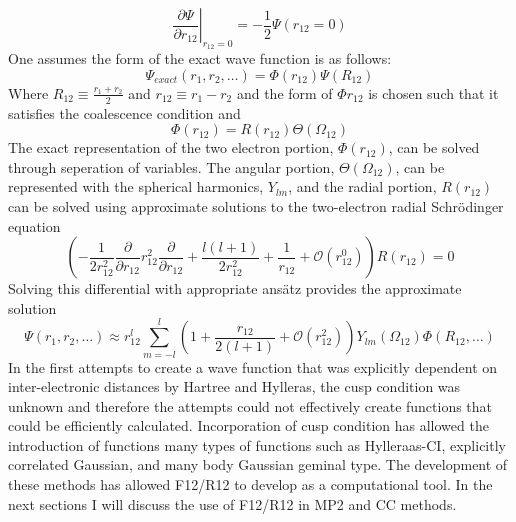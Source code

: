       \begin{equation}
          \left. \frac{\partial \Psi}{\partial r_{12}} \right |_{r_{12}=0} = - \frac{1}{2} \Psi(r_{12}=0)
        \end{equation}
    One assumes the form of the exact wave function is as follows:
      \begin{equation}
        \Psi_{exact}(r_1, r_2 , \dots) = \Phi(r_{12})\Psi(R_{12})
      \end{equation}
    Where $R_{12} \equiv \frac{r_1 + r_2}{2}$ and $r_{12} \equiv r_1 - r_2$ and the form of $\Phi{r_{12}}$ is chosen such that it satisfies the coalescence condition and 
      \begin{equation}
        \Phi(r_{12}) = R(r_{12})\Theta(\Omega_{12})
      \end{equation}
    The exact representation of the two electron portion, $\Phi(r_{12})$, can be solved through seperation of variables.  The angular portion, $\Theta(\Omega_{12})$, can be represented with the spherical harmonics, $Y_{lm}$, and the radial portion, $R(r_{12})$ can be solved using approximate solutions to the two-electron radial Schr{\"o}dinger equation
      \begin{equation}
        \left( -\frac{1}{2r^2_{12}} \frac{\partial}{\partial r_{12}} r^2_{12} \frac{\partial}{\partial r_{12}} + \frac{l(l+1)}{2r^2_{12}} + \frac{1}{r_{12}} + \mathcal{O}(r^0_{12}) \right) R(r_{12}) = 0
      \end{equation}
    Solving this differential with appropriate ans{\"a}tz provides the approximate solution
      \begin{equation}
        \Psi(r_1, r_2, \dots) \approx r^l_{12} \sum_{m=-l}^l\left( 1 + \frac{r_{12}}{2(l+1)} + \mathcal{O}(r^2_{12})\right) Y_{lm}(\Omega_{12})\Phi(R_{12},\dots)
      \end{equation}
    In the first attempts to create a wave function that was explicitly dependent on inter-electronic distances by Hartree \cite{Hartree 1928} and Hylleras\cite{Hylleras 1929}, the cusp condition was unknown and therefore the attempts could not effectively create functions that could be efficiently calculated.  Incorporation of cusp condition has allowed the introduction of functions many types of functions such as Hylleraas-CI, explicitly correlated Gaussian, and many body Gaussian geminal type.\cite{Kong 2012}  The development of these methods has allowed F12/R12 to develop as a computational tool.
    In the next sections I will discuss the use of F12/R12 in MP2 and CC methods.
